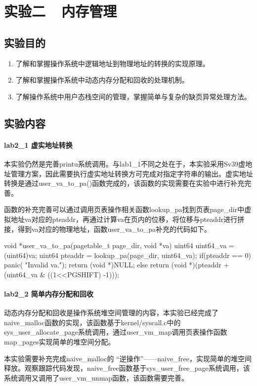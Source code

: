 \section{实验二\ \ 内存管理}

\subsection{实验目的}
\begin{enumerate}
    \item 了解和掌握操作系统中逻辑地址到物理地址的转换的实现原理。
    \item 了解和掌握操作系统中动态内存分配和回收的处理机制。
    \item 了解操作系统中用户态栈空间的管理，掌握简单与复杂的缺页异常处理方法。
\end{enumerate}

\subsection{实验内容}
\paragraph{lab2_1 虚实地址转换} 本实验仍然是完善printu系统调用。与lab1_1不同之处在于，本实验采用Sv39虚地址管理方案，因此需要执行虚实地址转换方可完成对指定字符串的输出。虚实地址转换是通过user_va_to_pa()函数完成的，该函数的实现需要在实验中进行补充完善。

函数的补充完善可以通过调用页表操作相关函数lookup_pa找到页表page_dir中虚拟地址va对应的pteaddr，再通过计算va在页内的位移，将位移与pteaddr进行拼接，得到va对应的物理地址，函数user_va_to_pa补充的代码如下。
\begin{cppcode}
void *user_va_to_pa(pagetable_t page_dir, void *va) {
    uint64 uint64_va = (uint64)va;
    uint64 pteaddr = lookup_pa(page_dir, uint64_va);
    if(pteaddr == 0) {
        panic( "Invalid va.\n");
        return (void *)NULL;
    }
    else return (void *)(pteaddr + (uint64_va & ((1<<PGSHIFT) -1)));
}
\end{cppcode}
\paragraph{lab2_2 简单内存分配和回收}
动态内存分配和回收是操作系统堆空间管理的内容，本实验已经完成了naive_malloc函数的实现，该函数基于kernel/syscall.c中的sys_user_allocate_page系统调用，通过user_vm_map调用页表操作函数map_pages实现简单的堆空间分配。

本实验需要补充完成naive_malloc的
“逆操作”——naive_free，实现简单的堆空间释放。观察跟踪代码发现，naive_free函数基于sys_user_free_page系统调用，该系统调用又调用了user_vm_unmap函数，该函数需要完善。

